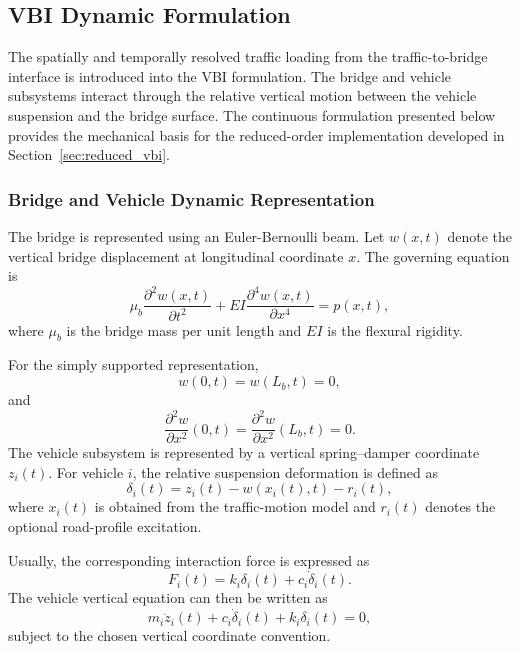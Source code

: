 \documentclass[journal]{IEEEtran}
\begin{document}
\subsection{VBI Dynamic Formulation}
\label{sec:vbi_dynamic_formulation}

The spatially and temporally resolved traffic loading from the traffic-to-bridge interface is introduced into the VBI formulation. The bridge and vehicle subsystems interact through the relative vertical motion between the vehicle suspension and the bridge surface. The continuous formulation presented below provides the mechanical basis for the reduced-order implementation developed in Section~\ref{sec:reduced_vbi}.

\subsubsection{Bridge and Vehicle Dynamic Representation}

The bridge is represented using an Euler-Bernoulli beam. Let $w(x,t)$ denote the vertical bridge displacement at longitudinal coordinate $x$. The governing equation is
\begin{equation}
\mu_b\frac{\partial^2 w(x,t)}{\partial t^2}+EI\frac{\partial^4 w(x,t)}{\partial x^4}=p(x,t),
\end{equation}
where $\mu_b$ is the bridge mass per unit length and $EI$ is the flexural rigidity.

For the simply supported representation,
\begin{equation}
w(0,t)=w(L_b,t)=0,
\end{equation}
and
\begin{equation}
\frac{\partial^2 w}{\partial x^2}(0,t)=\frac{\partial^2 w}{\partial x^2}(L_b,t)=0.
\end{equation}
The vehicle subsystem is represented by a vertical spring--damper coordinate $z_i(t)$. For vehicle $i$, the relative suspension deformation is defined as
\begin{equation}
\delta_i(t)=z_i(t)-w\!\left(x_i(t),t\right)-r_i(t),
\end{equation}
where $x_i(t)$ is obtained from the traffic-motion model and $r_i(t)$ denotes the optional road-profile excitation.

Usually, the corresponding interaction force is expressed as
\begin{equation}
F_i(t)=k_i\delta_i(t)+c_i\dot{\delta}_i(t).
\end{equation}
The vehicle vertical equation can then be written as
\begin{equation}
m_i\ddot{z}_i(t)+c_i\dot{\delta}_i(t)+k_i\delta_i(t)=0,
\end{equation}
subject to the chosen vertical coordinate convention.
\end{document}

